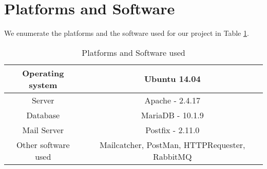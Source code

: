 \section[Platform]{Platforms and Software}

We enumerate the platforms and the software used for our project in Table \ref{tab:platsw}.
\begin{table}[!htbp]
	\centering
	\begin{tabular}{|c|c|}
		\hline
		Operating system & Ubuntu 14.04\\
		\hline
		Server & Apache - 2.4.17\\
		\hline
		Database & MariaDB - 10.1.9\\
		\hline
		Mail Server & Postfix - 2.11.0\\
		\hline
		Other software used & Mailcatcher, PostMan, HTTPRequester, RabbitMQ\\
		\hline
	\end{tabular}
	\caption{Platforms and Software used}
	\label{tab:platsw}
\end{table}